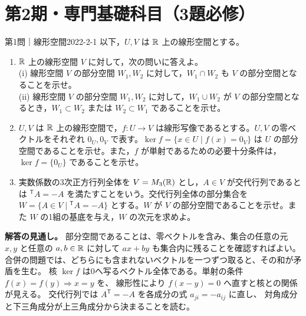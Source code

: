 \section{第2期・専門基礎科目（3題必修）}

\begin{problem}{第1問｜線形空間}{2022-2-1}
以下，$U,V$ は $\mathbb{R}$ 上の線形空間とする。
\begin{enumerate}
  \item[(1)] $\mathbb{R}$ 上の線形空間 $V$ に対して，次の問いに答えよ。\\
  (i) 線形空間 $V$ の部分空間 $W_1,W_2$ に対して，$W_1\cap W_2$ も $V$ の部分空間となることを示せ。\\
  (ii) 線形空間 $V$ の部分空間 $W_1,W_2$ に対して，$W_1\cup W_2$ が $V$ の部分空間となるとき，$W_1\subset W_2$ または $W_2\subset W_1$ であることを示せ。
  \item[(2)] $U,V$ は $\mathbb{R}$ 上の線形空間で，$f:U\to V$ は線形写像であるとする。$U,V$ の零ベクトルをそれぞれ $0_U,0_V$ で表す。$\ker f=\{x\in U\mid f(x)=0_V\}$ は $U$ の部分空間であることを示せ。また，$f$ が単射であるための必要十分条件は，$\ker f=\{0_U\}$ であることを示せ。
  \item[(3)] 実数係数の3次正方行列全体を $V=M_3(\mathbb{R})$ とし，$A\in V$ が交代行列であるとは ${}^{\mathsf T}A=-A$ を満たすことをいう。交代行列全体の部分集合を $W=\{A\in V\mid {}^{\mathsf T}A=-A\}$ とする。$W$ が $V$ の部分空間であることを示せ。また $W$ の1組の基底を与え，$W$ の次元を求めよ。
\end{enumerate}
\end{problem}
\begin{memo*}
\textbf{解答の見通し。}
部分空間であることは、零ベクトルを含み、集合の任意の元 $x,y$ と任意の $a,b\in\mathbb{R}$ に対して
$ax+by$ も集合内に残ることを確認すればよい。
合併の問題では、どちらにも含まれないベクトルを一つずつ取ると、その和が矛盾を生む。
核 $\ker f$ は0へ写るベクトル全体である。単射の条件 $f(x)=f(y)\Rightarrow x=y$ を、
線形性により $f(x-y)=0$ へ直すと核との関係が見える。
交代行列では $A^{\mathsf T}=-A$ を各成分の式 $a_{ji}=-a_{ij}$ に直し、
対角成分と下三角成分が上三角成分から決まることを読む。
\end{memo*}
